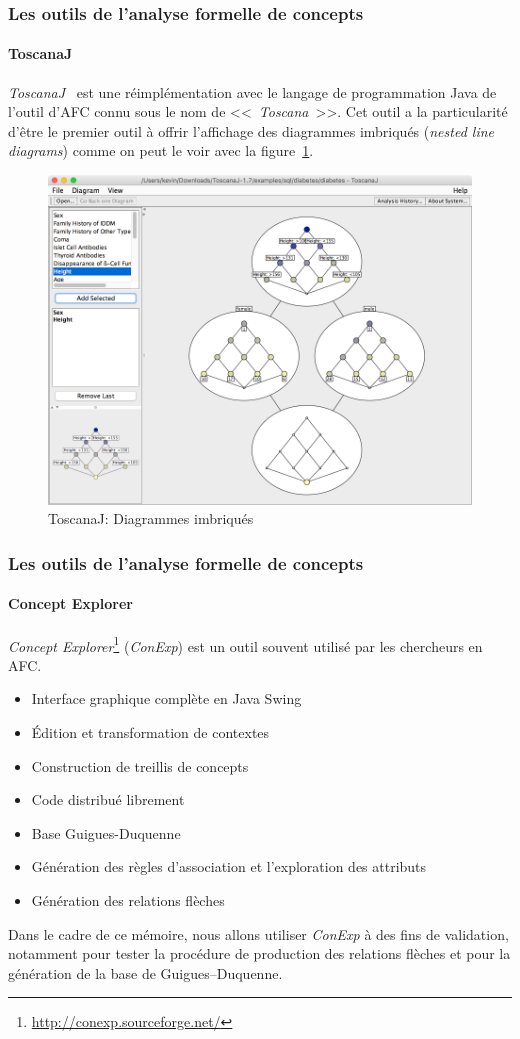 \documentclass[french]{beamer}
\begin{document}
\begin{frame}
\frametitle{Les outils de l'analyse formelle de concepts}
\framesubtitle{ToscanaJ}
\emph{ToscanaJ}~\parencite{Becker2002} est une réimplémentation avec le langage de programmation Java de l'outil d'AFC connu sous le nom de <<~\emph{Toscana}~>>. Cet outil a la particularité d'être le premier outil à offrir l'affichage des diagrammes imbriqués (\emph{nested line diagrams}) comme on peut le voir avec la figure~\ref{cap:fig:toscanaj-nested}.
\begin{figure}[H]
\caption{ToscanaJ: Diagrammes imbriqués}
\label{cap:fig:toscanaj-nested}
\begin{center}\includegraphics[scale=0.17]{figures/toscanaj-nested.png}\end{center}
\end{figure}
\end{frame}
\begin{frame}
\frametitle{Les outils de l'analyse formelle de concepts}
\framesubtitle{Concept Explorer}
\emph{Concept Explorer}\footnote{\url{http://conexp.sourceforge.net/}} (\emph{ConExp}) est un outil souvent utilisé par les chercheurs en AFC.
\begin{itemize}
\item Interface graphique complète en Java Swing
\item Édition et transformation de contextes
\item Construction de treillis de concepts
\item Code distribué librement
\item Base Guigues-Duquenne
\item Génération des règles d'association et l'exploration des attributs
\item Génération des relations flèches
\end{itemize}
Dans le cadre de ce mémoire, nous allons utiliser \emph{ConExp} à des fins de validation, notamment pour tester la procédure de production des relations flèches et pour la génération de la base de Guigues--Duquenne.

\end{frame}
\end{document}
